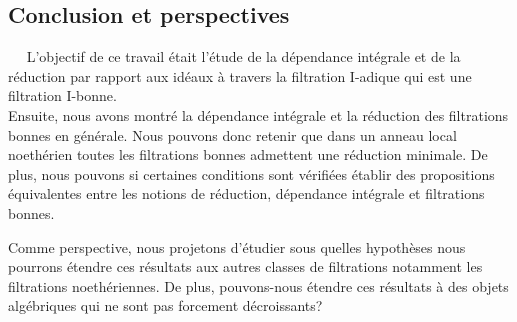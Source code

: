 \begin{center}
	\chapter*{Conclusion et perspectives}
\end{center}

$ \quad $ L'objectif de ce travail était l'étude de la dépendance intégrale et de la réduction par rapport aux idéaux à travers la filtration I-adique qui est une filtration I-bonne. \\
Ensuite, nous avons montré la dépendance intégrale et la réduction des filtrations bonnes en générale. Nous pouvons donc retenir que dans un anneau local noethérien toutes les filtrations bonnes admettent une réduction minimale. De plus, nous pouvons si certaines conditions sont vérifiées établir des propositions équivalentes entre les notions de réduction, dépendance intégrale et filtrations bonnes.

Comme perspective, nous projetons d'étudier sous quelles hypothèses nous pourrons étendre ces résultats aux autres classes de filtrations notamment les filtrations noethériennes. De plus, pouvons-nous étendre ces résultats à des objets algébriques qui ne sont pas forcement décroissants? 


